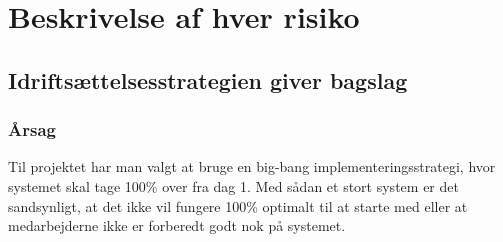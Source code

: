 \documentclass[10pt,a4paper,danish]{article}
\begin{document}
\section{Beskrivelse af hver risiko}










\subsection{Idriftsættelsesstrategien giver bagslag}
\subsubsection{Årsag}
Til projektet har man valgt at bruge en big-bang implementeringsstrategi, hvor systemet skal tage 100\% over fra dag 1.
Med sådan et stort system er det sandsynligt, at det ikke vil fungere 100\% optimalt til at starte med eller at medarbejderne ikke er forberedt godt nok på systemet.
\end{document}
